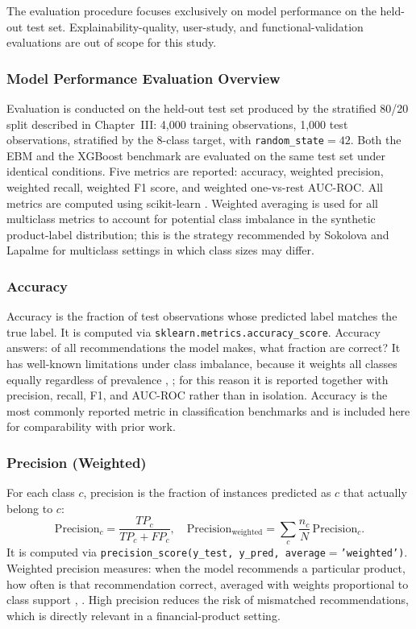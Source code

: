 \documentclass[journal]{./IEEE/IEEEtran}
\begin{document}
The evaluation procedure focuses exclusively on model performance on the held-out test set. Explainability-quality, user-study, and functional-validation evaluations are out of scope for this study.

\subsubsection{Model Performance Evaluation Overview}

Evaluation is conducted on the held-out test set produced by the stratified 80/20 split described in Chapter~III: 4{,}000 training observations, 1{,}000 test observations, stratified by the 8-class target, with \texttt{random\_state$=42$}. Both the EBM and the XGBoost benchmark are evaluated on the same test set under identical conditions. Five metrics are reported: accuracy, weighted precision, weighted recall, weighted F1 score, and weighted one-vs-rest AUC-ROC. All metrics are computed using scikit-learn \cite{ref74}. Weighted averaging is used for all multiclass metrics to account for potential class imbalance in the synthetic product-label distribution; this is the strategy recommended by Sokolova and Lapalme \cite{ref78} for multiclass settings in which class sizes may differ.

\subsubsection{Accuracy}

Accuracy is the fraction of test observations whose predicted label matches the true label. It is computed via \texttt{sklearn.metrics.accuracy\_score}. Accuracy answers: of all recommendations the model makes, what fraction are correct? It has well-known limitations under class imbalance, because it weights all classes equally regardless of prevalence \cite{ref78}, \cite{ref58}; for this reason it is reported together with precision, recall, F1, and AUC-ROC rather than in isolation. Accuracy is the most commonly reported metric in classification benchmarks \cite{ref87} and is included here for comparability with prior work.

\subsubsection{Precision (Weighted)}

For each class $c$, precision is the fraction of instances predicted as $c$ that actually belong to $c$:
\begin{equation*}
    \mathrm{Precision}_c = \frac{TP_c}{TP_c + FP_c}, \quad \mathrm{Precision}_{\mathrm{weighted}} = \sum_c \frac{n_c}{N}\,\mathrm{Precision}_c.
\end{equation*}
It is computed via \texttt{precision\_score(y\_test, y\_pred, average$=$'weighted')}. Weighted precision measures: when the model recommends a particular product, how often is that recommendation correct, averaged with weights proportional to class support \cite{ref79}, \cite{ref78}. High precision reduces the risk of mismatched recommendations, which is directly relevant in a financial-product setting.
\end{document}
